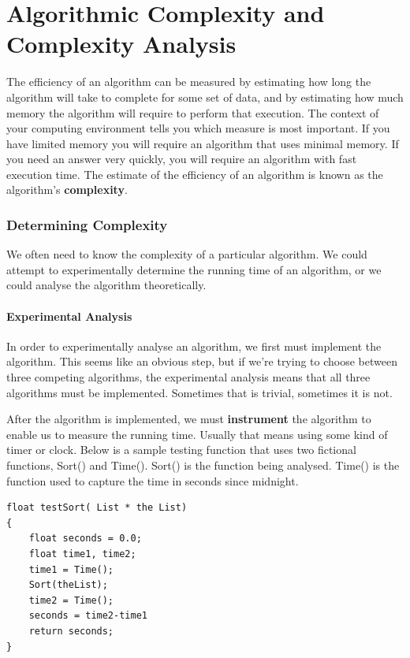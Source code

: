 

\chapter{Algorithmic Complexity and Complexity Analysis}

The efficiency of an algorithm can be measured by estimating how long the algorithm will take to complete for some set of data, and by
estimating how much memory the algorithm will require to perform that execution. The context of your computing environment tells you which
measure is most important. If you have limited memory you will require an algorithm that uses minimal memory. If you need an answer very
quickly, you will require an algorithm with fast execution time.   The estimate of the efficiency of an algorithm is known as the algorithm's \textbf{complexity}.



\subsection{Determining Complexity}

We often need to know the complexity of a particular algorithm.     We could attempt to experimentally determine the running time of an algorithm,  or we could analyse the algorithm theoretically.   


\subsubsection{Experimental Analysis}

In order to experimentally analyse an algorithm, we first must implement the algorithm.  This seems like an obvious step, but if we're trying to choose between three competing algorithms,  the experimental analysis means that all three algorithms must be implemented.    Sometimes that is trivial,  sometimes it is not.

After the algorithm is implemented,  we must \textbf{instrument} the algorithm to enable us to measure the running time.   Usually that means using  some kind of timer or clock.       Below is a sample testing function that uses two fictional functions,  Sort() and Time().  Sort() is the function being analysed.  Time() is the function used to capture the time in seconds since midnight.   

\begin{lstlisting}
float testSort( List * the List)
{
    float seconds = 0.0;
    float time1, time2;
    time1 = Time();
    Sort(theList);
    time2 = Time();
    seconds = time2-time1
    return seconds;
}
\end{lstlisting}

